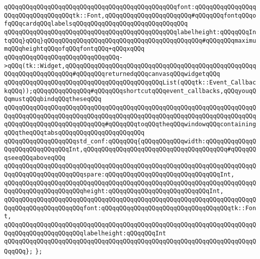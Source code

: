 \verb|qQQqqQQqqQQqqQQqqQQqqQQqqQQqqQQqqQQqqQQqqQQqqQQqfont:qQQqqQQqqQQqqQQqqQQqqQQqqQQqqQQqqQQqtk::Font,qQQqqQQqqQQqqQQqqQQqqQQq#qQQqqQQqfontqQQqofqQQqcardqQQqlabelsqQQqqQQqqQQqqQQqqQQqqQQqqQQqqQQq|\newline
\verb|qQQqqQQqqQQqqQQqqQQqqQQqqQQqqQQqqQQqqQQqqQQqqQQqlabelheight:qQQqqQQqIntqQQq}qQQq}qQQqqQQqqQQqqQQqqQQqqQQqqQQqqQQqqQQqqQQqqQQq#qQQqqQQqmaximumqQQqheightqQQqofqQQqfontqQQq+qQQqxqQQq|\newline
\verb|qQQqqQQqqQQqqQQqqQQqqQQqqQQqqQQq->qQQq(tk::Widget,qQQqqQQqqQQqqQQqqQQqqQQqqQQqqQQqqQQqqQQqqQQqqQQqqQQqqQQqqQQqqQQqqQQqqQQq#qQQqqQQqreturnedqQQqcanvasqQQqwidgetqQQq|\newline
\verb|qQQqqQQqqQQqqQQqqQQqqQQqqQQqqQQqqQQqqQQqqQQqList(qQQqtk::Event_CallbackqQQq));qQQqqQQqqQQqqQQq#qQQqqQQqshortcutqQQqevent_callbacks,qQQqyouqQQqmustqQQqbindqQQqtheseqQQq|\newline
\verb|qQQqqQQqqQQqqQQqqQQqqQQqqQQqqQQqqQQqqQQqqQQqqQQqqQQqqQQqqQQqqQQqqQQqqQQqqQQqqQQqqQQqqQQqqQQqqQQqqQQqqQQqqQQqqQQqqQQqqQQqqQQqqQQqqQQqqQQqqQQqqQQqqQQqqQQqqQQqqQQqqQQqqQQq#qQQqqQQqtoqQQqtheqQQqwindowqQQqcontainingqQQqtheqQQqtabsqQQqqQQqqQQqqQQqqQQqqQQq|\newline
\newline
\verb|qQQqqQQqqQQqqQQqqQQqstd_conf:qQQqqQQq{qQQqqQQqqQQqwidth:qQQqqQQqqQQqqQQqqQQqqQQqqQQqqQQqInt,qQQqqQQqqQQqqQQqqQQqqQQqqQQqqQQqqQQqqQQq#qQQqqQQqseeqQQqaboveqQQq|\newline
\verb|qQQqqQQqqQQqqQQqqQQqqQQqqQQqqQQqqQQqqQQqqQQqqQQqqQQqqQQqqQQqqQQqqQQqqQQqqQQqqQQqqQQqqQQqqQQqspare:qQQqqQQqqQQqqQQqqQQqqQQqqQQqqQQqInt,|\newline
\verb|qQQqqQQqqQQqqQQqqQQqqQQqqQQqqQQqqQQqqQQqqQQqqQQqqQQqqQQqqQQqqQQqqQQqqQQqqQQqqQQqqQQqqQQqqQQqheight:qQQqqQQqqQQqqQQqqQQqqQQqqQQqInt,|\newline
\verb|qQQqqQQqqQQqqQQqqQQqqQQqqQQqqQQqqQQqqQQqqQQqqQQqqQQqqQQqqQQqqQQqqQQqqQQqqQQqqQQqqQQqqQQqqQQqfont:qQQqqQQqqQQqqQQqqQQqqQQqqQQqqQQqqQQqtk::Font,|\newline
\verb|qQQqqQQqqQQqqQQqqQQqqQQqqQQqqQQqqQQqqQQqqQQqqQQqqQQqqQQqqQQqqQQqqQQqqQQqqQQqqQQqqQQqqQQqqQQqlabelheight:qQQqqQQqInt|\newline
\verb|qQQqqQQqqQQqqQQqqQQqqQQqqQQqqQQqqQQqqQQqqQQqqQQqqQQqqQQqqQQqqQQqqQQqqQQqqQQq};|\newline
\newline
\verb|};|\newline

